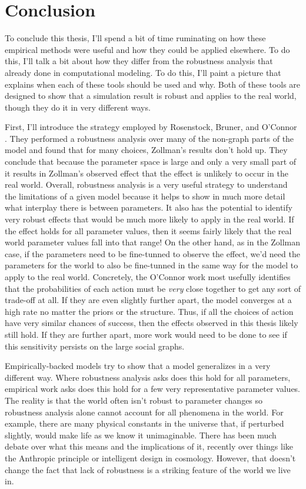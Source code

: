 \hypertarget{conclusion}{%
\chapter{Conclusion}\label{conclusion}}

To conclude this thesis, I'll spend a bit of time ruminating on how
these empirical methods were useful and how they could be applied
elsewhere. To do this, I'll talk a bit about how they differ from the
robustness analysis that already done in computational modeling. To do
this, I'll paint a picture that explains when each of these tools should
be used and why. Both of these tools are designed to show that a
simulation result is robust and applies to the real world, though they
do it in very different ways.

First, I'll introduce the strategy employed by Rosenstock, Bruner, and
O'Connor \autocite{rosenstockEpistemicNetworksLess2017a}. They performed
a robustness analysis over many of the non-graph parts of the model and
found that for many choices, Zollman's results don't hold up. They
conclude that because the parameter space is large and only a very small
part of it results in Zollman's observed effect that the effect is
unlikely to occur in the real world. Overall, robustness analysis is a
very useful strategy to understand the limitations of a given model
because it helps to show in much more detail what interplay there is
between parameters. It also has the potential to identify very robust
effects that would be much more likely to apply in the real world. If
the effect holds for all parameter values, then it seems fairly likely
that the real world parameter values fall into that range! On the other
hand, as in the Zollman case, if the parameters need to be fine-tunned
to observe the effect, we'd need the parameters for the world to also be
fine-tunned in the same way for the model to apply to the real world.
Concretely, the O'Connor work most usefully identifies that the
probabilities of each action must be \emph{very} close together to get
any sort of trade-off at all. If they are even slightly further apart,
the model converges at a high rate no matter the priors or the
structure. Thus, if all the choices of action have very similar chances
of success, then the effects observed in this thesis likely still hold.
If they are further apart, more work would need to be done to see if
this sensitivity persists on the large social graphs.

Empirically-backed models try to show that a model generalizes in a very
different way. Where robustness analysis asks does this hold for all
parameters, empirical work asks does this hold for a few very
representative parameter values. The reality is that the world often
isn't robust to parameter changes so robustness analysis alone cannot
account for all phenomena in the world. For example, there are many
physical constants in the universe that, if perturbed slightly, would
make life as we know it unimaginable. There has been much debate over
what this means and the implications of it, recently over things like
the Anthropic principle or intelligent design in cosmology. However,
that doesn't change the fact that lack of robustness is a striking
feature of the world we live in.

